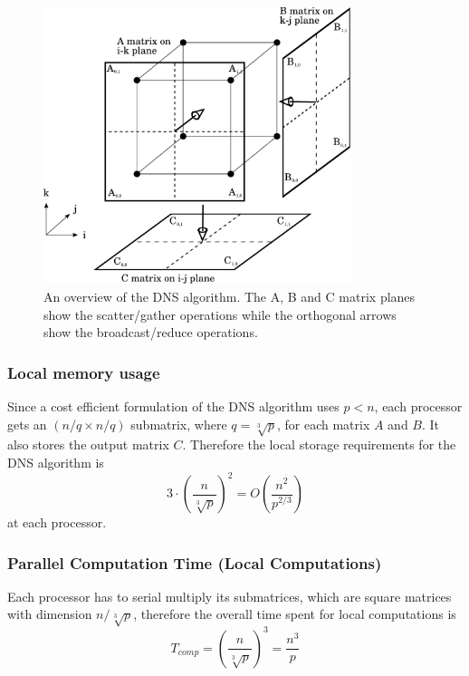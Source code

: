 \documentclass{article}
\begin{document}
\vspace{10pt}

\begin{figure}
	\centering
	\includegraphics[width=0.8\textwidth]{images/dns.pdf}
    \caption{An overview of the DNS algorithm.  The A, B and C matrix planes show the scatter/gather operations while the orthogonal arrows show the broadcast/reduce operations.}
    \label{fig:all_results}
\end{figure}

\subsubsection{Local memory usage}

Since a cost efficient formulation of the DNS algorithm uses $p < n$, each
processor gets an $(n/q \times n/q)$ submatrix, where $q = \sqrt[3]{p}$, for
each matrix $A$ and $B$.  It also stores the output matrix $C$.  Therefore the
local storage requirements for the DNS algorithm is $$3 \cdot {\left(\frac{n}{\sqrt[3]{p}}\right)}^2 = O\left(\frac{n^2}{p^{2/3}}\right)$$ at each
processor.

\subsubsection{Parallel Computation Time (Local Computations)}

Each processor has to serial multiply its submatrices, which are square matrices with dimension $ n/\sqrt[3]{p}$, therefore the
overall time spent for local computations is 
$$T_{{comp}} = \left(\frac{n}{\sqrt[3]{p}}\right)^3 = \frac{n^3}{p}$$
\end{document}
